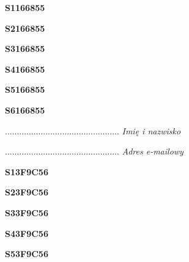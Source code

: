 \begin{turn}{90}\huge \textbf{S1166855}\end{turn}

\begin{turn}{90}\huge \textbf{S2166855}\end{turn}

\begin{turn}{90}\huge \textbf{S3166855}\end{turn}

\begin{turn}{90}\huge \textbf{S4166855}\end{turn}

\begin{turn}{90}\huge \textbf{S5166855}\end{turn}

\begin{turn}{90}\huge \textbf{S6166855}\end{turn}

\begin{turn}{90}\begin{minipage}{\linewidth} \vspace{20mm} ................................................  \textit{Imię i nazwisko}\end{minipage}\end{turn}

\begin{turn}{90}\begin{minipage}{\linewidth} \vspace{20mm} ................................................  \textit{Adres e-mailowy}\end{minipage}\end{turn}

\begin{turn}{90}\huge \textbf{S13F9C56}\end{turn}

\begin{turn}{90}\huge \textbf{S23F9C56}\end{turn}

\begin{turn}{90}\huge \textbf{S33F9C56}\end{turn}

\begin{turn}{90}\huge \textbf{S43F9C56}\end{turn}

\begin{turn}{90}\huge \textbf{S53F9C56}\end{turn}

